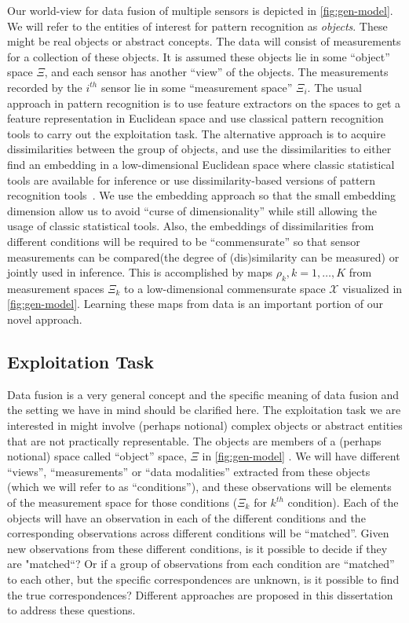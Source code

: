 \documentclass[12pt,oneside,final]{thesis}
\begin{document}
 Our world-view for data fusion of multiple sensors is depicted in \autoref{fig:gen-model}. We will refer to the entities of interest for pattern recognition as \emph{objects}. These might be real objects or abstract concepts. The data will consist  of measurements for a collection of these objects.
 It is assumed these objects lie in some ``object'' space $\Xi$, and each sensor has another ``view'' of the objects. The measurements recorded by the $i^{th}$ sensor lie in some ``measurement space'' $\Xi_i$. The usual approach in pattern recognition is to use feature extractors on the spaces to get a feature representation in Euclidean space and use classical pattern recognition tools to carry out the exploitation task. The alternative approach is to acquire dissimilarities between the group of objects, and use the dissimilarities to either find an embedding in a low-dimensional Euclidean space where classic statistical tools are available for inference or use dissimilarity-based versions of pattern recognition tools~\cite{duin2005dissimilarity}. We use the embedding approach  so that  the small  embedding dimension allow us to avoid ``curse of dimensionality'' while still allowing the usage of classic statistical tools. Also, the embeddings of dissimilarities from  different conditions will be required to be ``commensurate'' so that sensor measurements can be compared(\ie the degree of (dis)similarity can be measured) or jointly used in inference. This is accomplished by maps $\rho_k,k=1,\ldots,K$ from measurement spaces $\Xi_k$ to a low-dimensional commensurate space $\mathcal{X}$ visualized in \autoref{fig:gen-model}. Learning these maps from data is  an important portion of our novel  approach.
\label{sec:data}

\subsection{Exploitation Task\label{subsec:expl_task}}
Data fusion is a very general concept and the specific meaning of data fusion and the setting we have in mind should be clarified here. The exploitation task we are interested in might involve (perhaps notional) complex objects or abstract entities that are not practically representable. The objects are members of a (perhaps notional) space called ``object'' space, $\Xi$ in \autoref{fig:gen-model} . We will have different ``views'', ``measurements'' or ``data modalities'' extracted from these objects (which we will refer to as ``conditions''), and these observations will be elements of the measurement space for those conditions ($\Xi_k$ for $k^{th}$ condition). Each  of the objects will have an observation in each of the different conditions and the corresponding observations across different conditions will be ``matched''. Given new observations from these different conditions, is it possible to decide if they are "matched``? Or if a group of  observations from each condition are ``matched'' to each other, but the specific correspondences are unknown, is it possible to find the true correspondences? Different approaches are proposed in this dissertation to address these questions.
\label{subsec:task}
\end{document}

